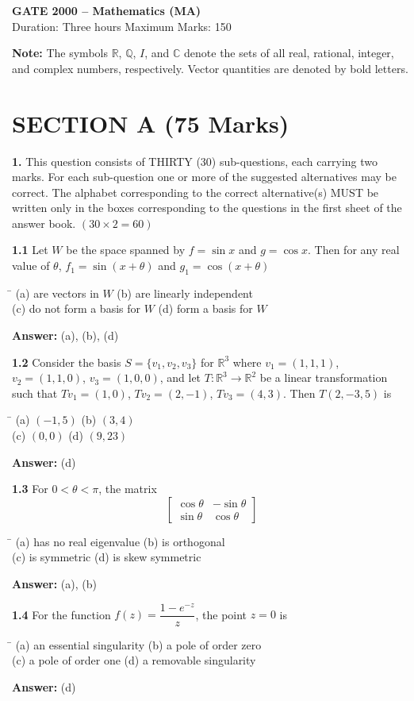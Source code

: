\documentclass[11pt,a4paper]{article}
\newcommand{\optsfour}[4]{%
  \begin{tabbing}
    \hspace{0.48\linewidth}\=\kill
    (a) #1 \> (b) #2 \\[2pt]
    (c) #3 \> (d) #4
  \end{tabbing}%
}
\newcommand{\ans}[1]{\textbf{Answer:} #1\par\medskip}
\begin{document}

\begin{center}
  {\Large\bfseries GATE 2000 -- Mathematics (MA)}\\[4pt]
  {\small Duration: Three hours \quad\textbar\quad Maximum Marks: 150}
\end{center}

\medskip
\textbf{Note:} The symbols $\mathbb{R}$, $\mathbb{Q}$, $I$, and $\mathbb{C}$ denote the sets of all real, rational, integer, and complex numbers, respectively. Vector quantities are denoted by bold letters.

\section*{SECTION A (75 Marks)}

\textbf{1.} This question consists of THIRTY (30) sub-questions, each carrying two marks. For each sub-question one or more of the suggested alternatives may be correct. The alphabet corresponding to the correct alternative(s) MUST be written only in the boxes corresponding to the questions in the first sheet of the answer book. \hfill $(30 \times 2 = 60)$

\medskip

\textbf{1.1} Let $W$ be the space spanned by $f = \sin x$ and $g = \cos x$. Then for any real value of $\theta$, $f_1 = \sin(x+\theta)$ and $g_1 = \cos(x+\theta)$
\optsfour{are vectors in $W$}{are linearly independent}{do not form a basis for $W$}{form a basis for $W$}
\ans{(a), (b), (d)}

\textbf{1.2} Consider the basis $S = \{v_1, v_2, v_3\}$ for $\mathbb{R}^3$ where $v_1 = (1,1,1)$, $v_2 = (1,1,0)$, $v_3 = (1,0,0)$, and let $T : \mathbb{R}^3 \to \mathbb{R}^2$ be a linear transformation such that $Tv_1 = (1,0)$, $Tv_2 = (2,-1)$, $Tv_3 = (4,3)$. Then $T(2,-3,5)$ is
\optsfour{$(-1,5)$}{$(3,4)$}{$(0,0)$}{$(9,23)$}
\ans{(d)}

\textbf{1.3} For $0 < \theta < \pi$, the matrix
\[
  \begin{bmatrix} \cos\theta & -\sin\theta \\ \sin\theta & \cos\theta \end{bmatrix}
\]
\optsfour{has no real eigenvalue}{is orthogonal}{is symmetric}{is skew symmetric}
\ans{(a), (b)}

\textbf{1.4} For the function $f(z) = \dfrac{1 - e^{-z}}{z}$, the point $z = 0$ is
\optsfour{an essential singularity}{a pole of order zero}{a pole of order one}{a removable singularity}
\ans{(d)}
\end{document}
